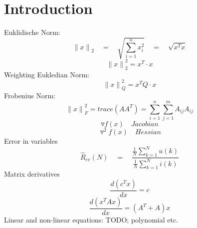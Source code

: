 
\section*{Introduction}
Euklidische Norm: 
\begin{equation*}
{ \parallel x\parallel  }_{ 2 }\quad =\quad \sqrt { \sum _{ i=1 }^{ n }{ { x }_{ i }^{ 2 } }  } \quad =\quad \sqrt { { x }^{ T }x }
\end{equation*}
\begin{equation*}
{\parallel x\parallel  }_{ 2 }^{ 2 } = x^T\cdot x
\end{equation*}
Weighting Eukledian Norm:
\begin{equation*}
{\parallel x\parallel  }_{ Q }^{ 2 } = x^TQ \cdot x
\end{equation*}
Frobenius Norm:
\begin{equation*}
{\parallel x\parallel  }_{ F }^{ 2 } = trace(A{ A }^{ T })=\sum _{ i=1 }^{ n } \sum _{ j=1 }^{ m }{ { A }_{ ij }{ A }_{ ij } } 
\end{equation*}
\begin{equation*}
\triangledown f(x) \quad Jacobian
\end{equation*}
\begin{equation*}
{ \triangledown  }^{ 2 }f(x)\quad Hessian
\end{equation*}
Error in variables
\begin{equation*}
\hat { R } _{ ev }(N)\quad =\quad \frac { \frac { 1 }{ N } \sum _{ k=1 }^{ N }{ u(k) }  }{ \frac { 1 }{ N } \sum _{ k=1 }^{ N }{ i(k) }  }
\end{equation*}
Matrix derivatives
\begin{equation*}
\frac{d(c^Tx)}{dx} = c
\end{equation*} 
\begin{equation*}
\frac{d(x^TAx)}{dx} = (A^T + A)x
\end{equation*} 
Linear and non-linear equations:
TODO; polynomial etc. 

